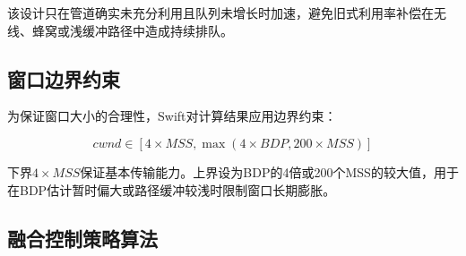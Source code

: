 该设计只在管道确实未充分利用且队列未增长时加速，避免旧式利用率补偿在无线、蜂窝或浅缓冲路径中造成持续排队。

\subsection{窗口边界约束}

为保证窗口大小的合理性，Swift对计算结果应用边界约束：

\begin{equation}
cwnd \in [4 \times MSS, \max(4 \times BDP, 200 \times MSS)]
\end{equation}

下界$4 \times MSS$保证基本传输能力。上界设为BDP的4倍或200个MSS的较大值，用于在BDP估计暂时偏大或路径缓冲较浅时限制窗口长期膨胀。

\subsection{融合控制策略算法}

